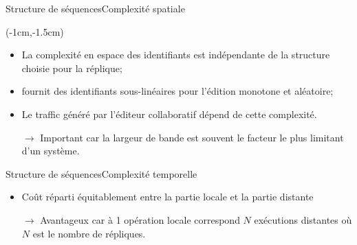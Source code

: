 \begin{frame}{Structure de séquences}{Complexité spatiale}
  \vspace{1cm}
  
  \begin{textblock*}{\textwidth}(-1cm,-1.5cm) 
    \begin{table}[H]
      
    \end{table}
  \end{textblock*}
  
  \vspace{2cm}
  
  \begin{itemize}
  \item La complexité en espace des identifiants est indépendante de la
    structure choisie pour la réplique;
  \item \LSEQ fournit des identifiants sous-linéaires pour l'édition monotone
    et aléatoire;
  \item Le traffic généré par l'éditeur collaboratif dépend de cette complexité.
  \item [$\rightarrow$] Important car la largeur de bande est souvent le facteur
    le plus limitant d'un système.
  \end{itemize}
  
  
\end{frame}


\begin{frame}{Structure de séquences}{Complexité temporelle}

  \begin{center}
    
  \end{center}
  
  \vspace{0.5cm}
  
  \begin{itemize}
  \item Coût réparti équitablement entre la partie locale et la partie distante
  \item [$\rightarrow$] Avantageux car à 1 opération locale correspond $N$
    exécutions distantes où $N$ est le nombre de répliques.
  \end{itemize}
  
\end{frame}

